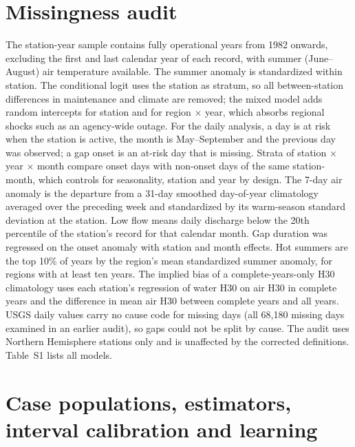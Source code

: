 \documentclass[draft]{agujournal2025}
\begin{document}
\section{Missingness audit}
The station-year sample contains fully operational years from 1982 onwards, excluding the first and last calendar year of each record, with summer (June--August) air temperature available. The summer anomaly is standardized within station. The conditional logit uses the station as stratum, so all between-station differences in maintenance and climate are removed; the mixed model adds random intercepts for station and for region $\times$ year, which absorbs regional shocks such as an agency-wide outage. For the daily analysis, a day is at risk when the station is active, the month is May--September and the previous day was observed; a gap onset is an at-risk day that is missing. Strata of station $\times$ year $\times$ month compare onset days with non-onset days of the same station-month, which controls for seasonality, station and year by design. The 7-day air anomaly is the departure from a 31-day smoothed day-of-year climatology averaged over the preceding week and standardized by its warm-season standard deviation at the station. Low flow means daily discharge below the 20th percentile of the station's record for that calendar month. Gap duration was regressed on the onset anomaly with station and month effects. Hot summers are the top 10\% of years by the region's mean standardized summer anomaly, for regions with at least ten years. The implied bias of a complete-years-only H30 climatology uses each station's regression of water H30 on air H30 in complete years and the difference in mean air H30 between complete years and all years. USGS daily values carry no cause code for missing days (all 68,180 missing days examined in an earlier audit), so gaps could not be split by cause. The audit uses Northern Hemisphere stations only and is unaffected by the corrected definitions. Table~S1 lists all models.

\section{Case populations, estimators, interval calibration and learning}
\end{document}
